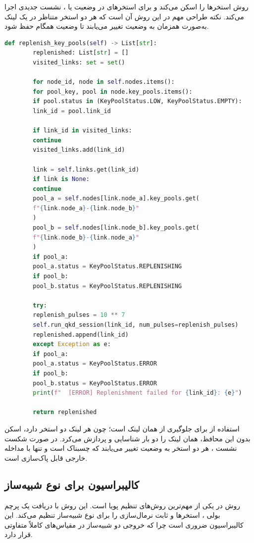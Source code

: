 روش  استخرها را اسکن می‌کند و برای استخرهای در وضعیت  یا ، نشست  جدیدی اجرا می‌کند. نکته طراحی مهم در این روش آن است که هر دو استخر متناظر در یک لینک به‌صورت همزمان به وضعیت  تغییر می‌یابند تا وضعیت همگام حفظ شود.

\begin{LTR}
	\begin{lstlisting}[language=Python]
		def replenish_key_pools(self) -> List[str]:
		replenished: List[str] = []
		visited_links: set = set()
		
		for node_id, node in self.nodes.items():
		for pool_key, pool in node.key_pools.items():
		if pool.status in (KeyPoolStatus.LOW, KeyPoolStatus.EMPTY):
		link_id = pool.link_id
		
		if link_id in visited_links:
		continue
		visited_links.add(link_id)
		
		link = self.links.get(link_id)
		if link is None:
		continue
		pool_a = self.nodes[link.node_a].key_pools.get(
		f"{link.node_a}-{link.node_b}"
		)
		pool_b = self.nodes[link.node_b].key_pools.get(
		f"{link.node_b}-{link.node_a}"
		)
		if pool_a:
		pool_a.status = KeyPoolStatus.REPLENISHING
		if pool_b:
		pool_b.status = KeyPoolStatus.REPLENISHING
		
		try:
		replenish_pulses = 10 ** 7
		self.run_qkd_session(link_id, num_pulses=replenish_pulses)
		replenished.append(link_id)
		except Exception as e:
		if pool_a:
		pool_a.status = KeyPoolStatus.ERROR
		if pool_b:
		pool_b.status = KeyPoolStatus.ERROR
		print(f"  [ERROR] Replenishment failed for {link_id}: {e}")
		
		return replenished
	\end{lstlisting}
\end{LTR}

استفاده از  برای جلوگیری از  همان لینک است؛ چون هر لینک دو استخر دارد، اسکن بدون این محافظ، همان لینک را دو بار شناسایی و پردازش می‌کرد. در صورت شکست نشست ، هر دو استخر به وضعیت  تغییر می‌یابند که چسبناک است و تنها با مداخله خارجی قابل پاک‌سازی است.

\subsection{کالیبراسیون برای نوع شبیه‌ساز}

روش  در  یکی از مهم‌ترین روش‌های تنظیم پویا است. این روش با دریافت یک پرچم بولی ،  استخرها و ثابت نرمال‌سازی  را برای نوع شبیه‌ساز تنظیم می‌کند. این کالیبراسیون ضروری است چرا که خروجی دو شبیه‌ساز در مقیاس‌های کاملاً متفاوتی قرار دارد.

